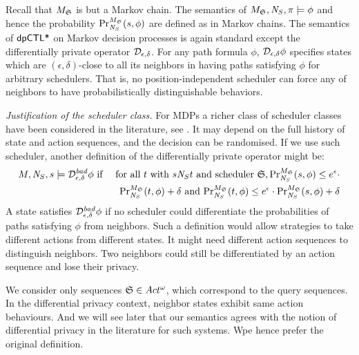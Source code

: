 Recall that $M_{\scheduler{S}}$ is but a Markov chain. The semantics
of $M_{\scheduler{S}}, \neighbor{S}, \pi \models \phi$ and hence the
probability $\myPr{s}{M_{\scheduler{S}}}{\neighbor{S}}{\phi}$ are
defined as in Markov chains.
The semantics of $\dpCTLstar$ on Markov decision processes
is again standard except the differentially private operator
$\dpriv{\epsilon}{\delta}$. For any path formula $\phi$,
$\dpriv{\epsilon}{\delta} \phi$ specifies states which are $(\epsilon,
\delta)$-close to all its neighbors in having paths satisfying $\phi$
for arbitrary schedulers. That is, no
position-independent scheduler can force any of neighbors to have
probabilistically distinguishable behaviors.

\noindent
\emph{Justification of the scheduler class.}
For MDPs a richer class of scheduler classes have been considered in the literature, see \cite{BK:08:PMC}. It may depend on the full history of state and action sequences, and the decision can be randomised. If we use such scheduler, another definition of the differentially private operator
might be:
\begin{eqnarray*}
  M, \neighbor{S}, s \models \dpriv{\epsilon}{\delta}^{\mathit{bad}} \phi
  & \textmd{ if } &
  \textmd{for all } t \textmd{ with } s \neighbor{S} t \textmd{ and
  scheduler } \scheduler{S},
  \myPr{s}{M_{\scheduler{S}}}{\neighbor{S}}{\phi} \leq
  e^{\epsilon} \cdot\\
  && \myPr{t}{M_{\scheduler{S}}}{\neighbor{S}}{\phi} + \delta \textmd{ and }
  \myPr{t}{M_{\scheduler{S}}}{\neighbor{S}}{\phi} \leq
  e^{\epsilon} \cdot \myPr{s}{M_{\scheduler{S}}}{\neighbor{S}}{\phi}
  + \delta
\end{eqnarray*}
A state satisfies $\dpriv{\epsilon}{\delta}^{\mathit{bad}} \phi$ if
no scheduler could differentiate the probabilities of paths satisfying
$\phi$ from neighbors. Such a definition would allow strategies to
take different actions from different states. It might need different
action sequences to distinguish  neighbors. Two neighbors could still be
differentiated by an action sequence and lose their privacy.

We consider only sequences $\scheduler{S}\in Act^\omega$, which correspond to the query sequences. In the differential privacy context, neighbor states exhibit same action behaviours. And we will see later that
our semantics agrees with the notion of differential privacy in the literature for such systems.
Wpe hence
prefer the original definition.

